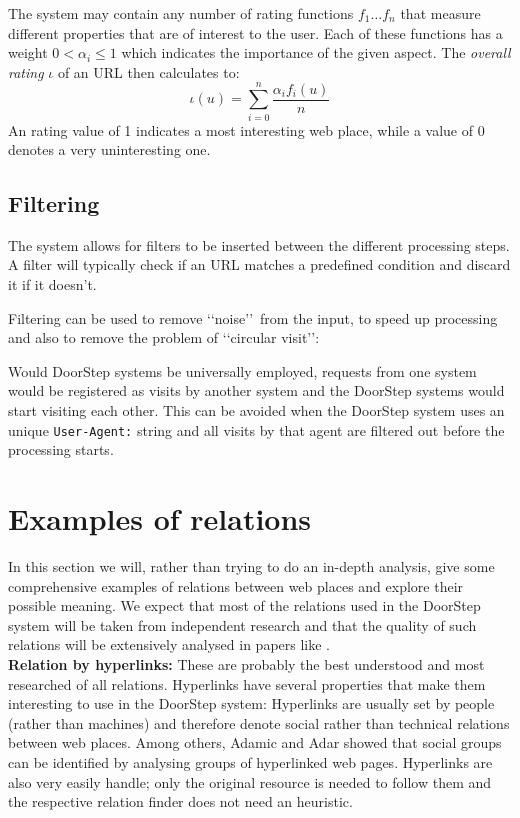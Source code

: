 \documentclass[a4paper,twoside]{danarticle}
\theoremstyle{remark}
\begin{document}
       The system may contain any number of rating functions $ f_1
       \dots f_n $ that measure different properties that are of interest to
       the user.
       Each of these functions has a weight
       $ 0 < \alpha_i \leq 1 $ which indicates the importance of the given 
       aspect.
       The \textit{overall rating} $ \iota $ of an URL then calculates
       to:
       \[
         \iota(u) = \sum_{i = 0}^{n} 
	 \frac{\alpha_i f_i(u)}{n}
       \]
       An rating value of 1 indicates a most interesting web place,
       while a
       value of 0 denotes a very uninteresting one. 
     \subsection{Filtering}
       The system allows for filters to be inserted between the different
       processing steps. A filter will typically check if an URL matches a
       predefined condition and discard it if it doesn't.
       
       Filtering can be used to remove \lq\lq noise\rq\rq\ from the input, to 
       speed up processing and also to remove the problem of 
       \lq\lq circular visit\rq\rq : 
       
       Would DoorStep systems be universally 
       employed, requests from one system would be registered as visits by 
       another system and the DoorStep systems would start visiting each other. 
       This can be avoided when the DoorStep system uses an unique 
       \verb$User-Agent:$ string and all visits by that agent are filtered out 
       before the processing starts.
  \section{Examples of relations}
    \label{relexample}
    In this section we will, rather than trying to do an in-depth analysis, give some 
    comprehensive examples of relations between web places and explore their 
    possible meaning. We expect that most of the relations used in the 
    DoorStep system will be taken from independent research and that the quality 
    of such relations will be extensively analysed in papers like \cite{links}.
    \\
    
    \textbf{Relation by hyperlinks:} These are probably the best understood and 
    most researched of all relations. Hyperlinks have several properties that 
    make them interesting to use in the DoorStep system: Hyperlinks are usually 
    set by people (rather than machines) and therefore denote social rather than 
    technical relations between web places. Among others, Adamic and Adar 
    showed that 
    social groups can be identified by analysing groups of hyperlinked web 
    pages\cite{links}. Hyperlinks are also very easily handle; only the original
    resource is needed to follow them and the respective relation finder does
    not need an heuristic.
    \\
    
\end{document}

